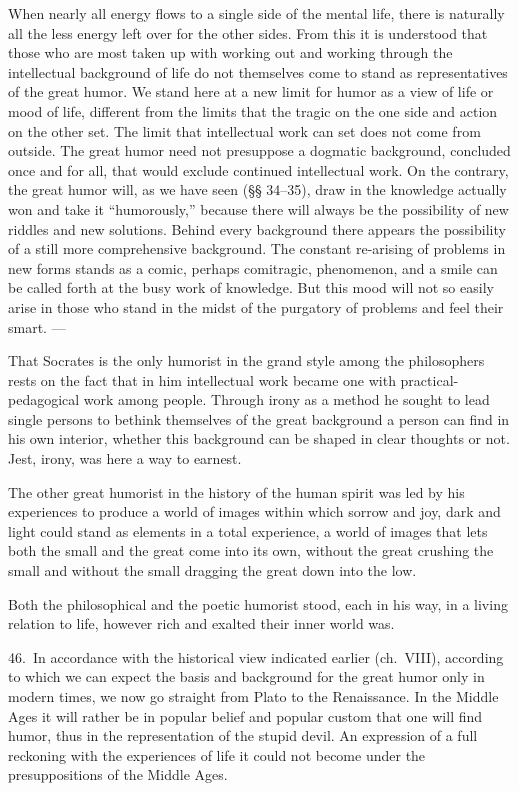 \documentclass[12pt]{book}
\newcommand{\opage}[1]{\marginnote{\footnotesize\textit{[#1]}}}
\begin{document}
When nearly all energy flows to a single side of the mental life, there is naturally all the less
energy left over for the other sides. From this it is understood that those who are most taken
up with working out and working through the intellectual background of life do not themselves come
to stand as representatives of the great humor. We stand here at a new limit for humor as a view
of life or mood of life, different from the limits that the tragic on the one side and action on
the other set. The limit that intellectual work can set does not come from outside. The great
humor need not presuppose a dogmatic background, concluded once and for all, that would exclude
continued intellectual work. On the contrary, the great humor will, as we have seen (§§ 34--35),
draw in the knowledge actually won and take it ``humorously,'' because there will always be the
possibility of new riddles and new solutions. Behind every background there appears the
possibility of a still more comprehensive background. The constant re-arising of problems in new
forms stands as a comic, perhaps comitragic, phenomenon, and a smile can be called forth at the
busy work of knowledge. But this \opage{154}mood will not so easily arise in those who stand in
the midst of the purgatory of problems and feel their smart. ---

That Socrates is the only humorist in the grand style among the philosophers rests on the fact
that in him intellectual work became one with practical-pedagogical work among people. Through
irony as a method he sought to lead single persons to bethink themselves of the great background a
person can find in his own interior, whether this background can be shaped in clear thoughts or
not. Jest, irony, was here a way to earnest.

The other great humorist in the history of the human spirit was led by his experiences to produce
a world of images within which sorrow and joy, dark and light could stand as elements in a total
experience, a world of images that lets both the small and the great come into its own, without
the great crushing the small and without the small dragging the great down into the low.

Both the philosophical and the poetic humorist stood, each in his way, in a living relation to
life, however rich and exalted their inner world was.

46.~In accordance with the historical view indicated earlier (ch.~VIII), according to which we can
expect the basis and background for the great humor only in modern times, we now go straight from
Plato to the Renaissance. In the Middle Ages it will rather be in popular belief and popular custom
that one will find humor, thus in the representation of the stupid devil. An expression of a full
reckoning with the experiences of life it could not become under the presuppositions of the Middle
Ages.
\end{document}
